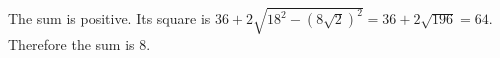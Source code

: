 The sum is positive. Its square is $ 36+2\sqrt{18^2-(8\sqrt2)^2}=36+2\sqrt{196}=64 $. Therefore the sum is $\boxed8 $.
